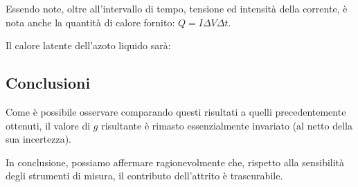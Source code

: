 \documentclass{article}
\begin{document}
  Essendo note, oltre all'intervallo di tempo, tensione ed intensità della corrente,
  è nota anche la quantità di calore fornito: $Q = I \Delta V \Delta t$.

  Il calore latente dell'azoto liquido sarà:

\subsection{Conclusioni}

Come è possibile osservare comparando questi risultati a
quelli precedentemente ottenuti, il valore di $g$ risultante
è rimasto essenzialmente invariato (al netto della sua incertezza).

In conclusione, possiamo affermare ragionevolmente che,
rispetto alla sensibilità degli strumenti di misura,
il contributo dell'attrito è trascurabile.
\end{document}
